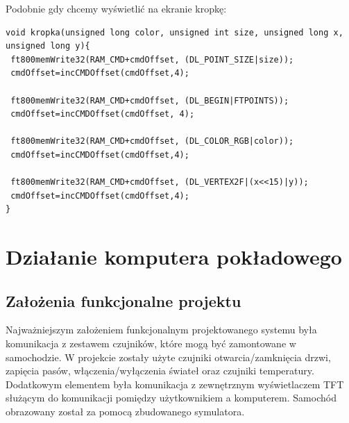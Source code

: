\documentclass{xmgr}
\begin{document}
Podobnie gdy chcemy wyświetlić na ekranie kropkę:
\begin{lstlisting}[label=bot-dirs-alg,caption=Narysowanie kropki na ekranie]
void kropka(unsigned long color, unsigned int size, unsigned long x, 
unsigned long y){ 
 ft800memWrite32(RAM_CMD+cmdOffset, (DL_POINT_SIZE|size));
 cmdOffset=incCMDOffset(cmdOffset,4);

 ft800memWrite32(RAM_CMD+cmdOffset, (DL_BEGIN|FTPOINTS));
 cmdOffset=incCMDOffset(cmdOffset, 4);

 ft800memWrite32(RAM_CMD+cmdOffset, (DL_COLOR_RGB|color));
 cmdOffset=incCMDOffset(cmdOffset,4);
 
 ft800memWrite32(RAM_CMD+cmdOffset, (DL_VERTEX2F|(x<<15)|y));
 cmdOffset=incCMDOffset(cmdOffset,4);
}
\end{lstlisting}


\chapter{Działanie komputera pokładowego}
\section{Założenia funkcjonalne projektu}
Najważniejszym założeniem funkcjonalnym projektowanego systemu była komunikacja z zestawem czujników, które mogą być zamontowane w samochodzie. W projekcie zostały użyte czujniki otwarcia/zamknięcia drzwi, zapięcia pasów, włączenia/wyłączenia świateł oraz czujniki temperatury. Dodatkowym elementem była komunikacja z zewnętrznym wyświetlaczem TFT służącym do komunikacji pomiędzy użytkownikiem a komputerem. Samochód obrazowany został za pomocą zbudowanego symulatora.
\end{document}
